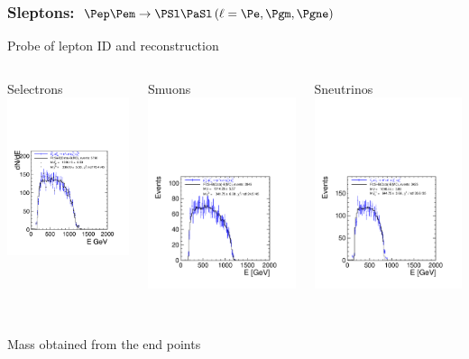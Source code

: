 \documentclass{beamer}
\begin{document}
\begin{frame}
\frametitle{Sleptons: $\Pep\Pem \to \PSl \PaSl \,(\ell = \Pe,\Pgm,\Pgne)$}
Probe of \alert{lepton ID and reconstruction}
\begin{columns}[c]
\column{3.8cm}
\begin{center}
Selectrons\\
\includegraphics[width=3.8cm]{202_H1LPADC4.pdf}
\end{center}
\column{4.6cm}
\begin{center}
Smuons\\
\includegraphics[width=4.6cm]{205_H1LPADC4.pdf}
\end{center}
\column{4.6cm}
\begin{center}
Sneutrinos\\
\includegraphics[width=4.6cm]{213_H1LPADC4.pdf}
\end{center}
\end{columns}
~\\
Mass obtained from the end points
\end{frame}
\end{document}
